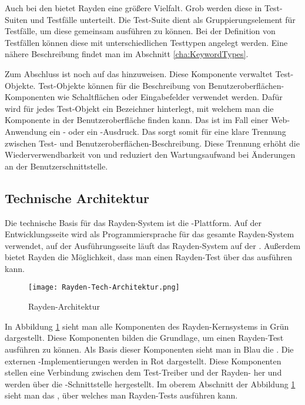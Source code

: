 \SuperPar
Auch bei den  bietet Rayden eine größere Vielfalt. Grob werden diese in Test-Suiten und Testfälle unterteilt. Die Test-Suite dient als Gruppierungselement für Testfälle, um diese gemeinsam ausführen zu können. Bei der Definition von Testfällen können diese mit unterschiedlichen Testtypen angelegt werden. Eine nähere Beschreibung findet man im Abschnitt \ref{cha:KeywordTypes}.

\SuperPar
Zum Abschluss ist noch auf das  hinzuweisen. Diese Komponente verwaltet Test-Objekte. Test-Objekte können für die Beschreibung von Benutzeroberflächen-Komponenten wie Schaltflächen oder Eingabefelder verwendet werden. Dafür wird für jedes Test-Objekt ein Bezeichner hinterlegt, mit welchem man die Komponente in der Benutzeroberfläche finden kann. Das ist im Fall einer Web-Anwendung ein - oder ein -Ausdruck. Das  sorgt somit für eine klare Trennung zwischen Test- und Benutzeroberflächen-Beschreibung. Diese Trennung erhöht die Wiederverwendbarkeit von  und reduziert den Wartungsaufwand bei Änderungen an der Benutzerschnittstelle.

\subsection{Technische Architektur}

Die technische Basis für das Rayden-System ist die -Plattform. Auf der Entwicklungsseite wird  als Programmiersprache für das gesamte Rayden-System verwendet, auf der Ausführungsseite läuft das Rayden-System auf der . Außerdem bietet Rayden die Möglichkeit, dass man einen Rayden-Test über das \cite{JavaScriptApi} ausführen kann. 

\begin{figure}[h]
\centering
\texttt{[image: Rayden-Tech-Architektur.png]}
\caption{Rayden-Architektur}
\label{fig:rayden-tech-arch}
\end{figure}

\SuperPar
In Abbildung \ref{fig:rayden-tech-arch} sieht man alle Komponenten des Rayden-Kernsystems in Grün dargestellt. Diese Komponenten bilden die Grundlage, um einen Rayden-Test ausführen zu können. Als Basis dieser Komponenten sieht man in Blau die . Die externen -Implementierungen werden in Rot dargestellt. Diese Komponenten stellen eine Verbindung zwischen dem Test-Treiber und der Rayden- her und werden über die -Schnittstelle hergestellt. Im oberem Abschnitt der Abbildung \ref{fig:rayden-tech-arch} sieht man das , über welches man Rayden-Tests ausführen kann.

